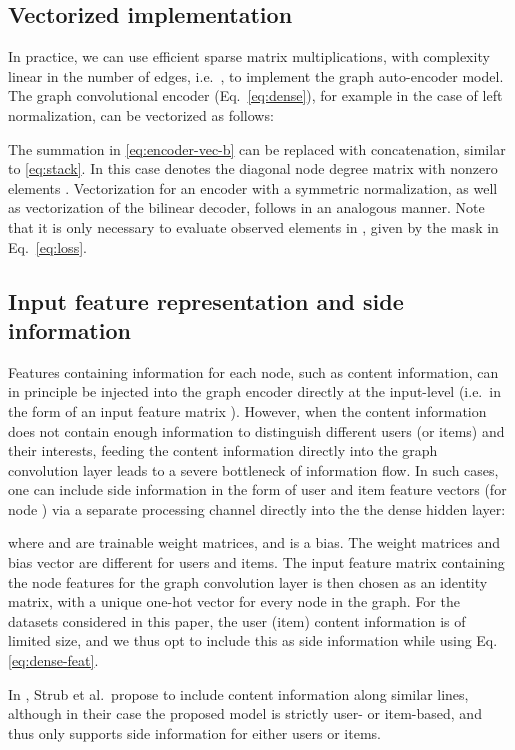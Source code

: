 \documentclass[twoside]{article}
\begin{document}
\subsection{Vectorized implementation}
In practice, we can use efficient sparse matrix multiplications, with complexity linear in the number of edges, i.e.~, to implement the graph auto-encoder model. The graph convolutional encoder (Eq.~\ref{eq:dense}), for example in the case of left normalization, can be vectorized as follows:

The summation in \eqref{eq:encoder-vec-b} can be replaced with concatenation, similar to \eqref{eq:stack}.
In this case  denotes the diagonal node degree matrix with nonzero elements . Vectorization for an encoder with a symmetric normalization, as well as vectorization of the bilinear decoder, follows in an analogous manner. Note that it is only necessary to evaluate observed elements in , given by the mask  in Eq.~\ref{eq:loss}.

\subsection{Input feature representation and side information}
\label{subsection:features}
Features containing information for each node, such as content information, can in principle be injected into the graph encoder directly at the input-level (i.e.~in the form of an input feature matrix ). However, when the content information does not contain enough information to distinguish different users (or items) and their interests, feeding the content information directly into the graph convolution layer leads to a severe bottleneck of information flow. In such cases, 
one can include side information in the form of user and item feature vectors  (for node ) via a separate processing channel directly into the the dense hidden layer:

where  and  are trainable weight matrices, and  is a bias. The weight matrices and bias vector are different for users and items. The input feature matrix  containing the node features for the graph convolution layer is then chosen as an identity matrix, with a unique one-hot vector for every node in the graph. For the datasets considered in this paper, the user (item) content information is of limited size, and we thus opt to include this as side information while using Eq. \eqref{eq:dense-feat}.

In \cite{strub2016hybrid}, Strub et al.~propose to include content information along similar lines, although in their case the proposed model is strictly user- or item-based, and thus only supports side information for either users or items.
\end{document}
